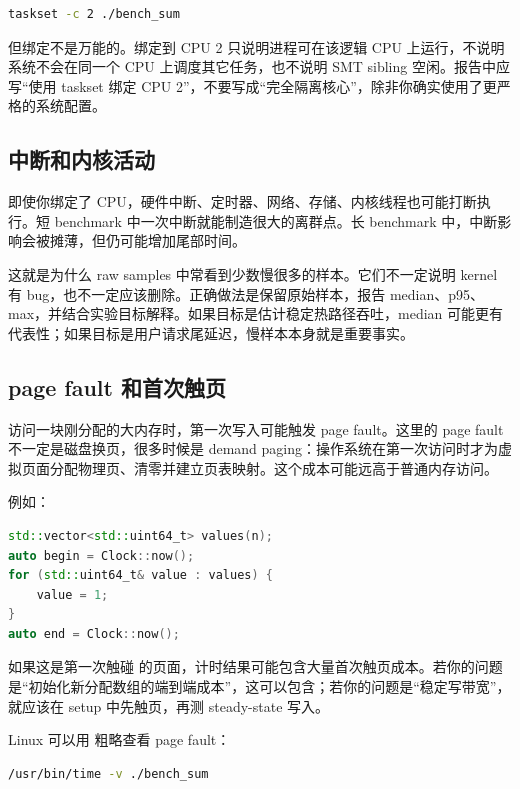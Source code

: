 \begin{lstlisting}[language=bash]
taskset -c 2 ./bench_sum
\end{lstlisting}

但绑定不是万能的。绑定到 CPU 2 只说明进程可在该逻辑 CPU 上运行，不说明系统不会在同一个 CPU 上调度其它任务，也不说明 SMT sibling 空闲。报告中应写“使用 taskset 绑定 CPU 2”，不要写成“完全隔离核心”，除非你确实使用了更严格的系统配置。

\subsection{中断和内核活动}

即使你绑定了 CPU，硬件中断、定时器、网络、存储、内核线程也可能打断执行。短 benchmark 中一次中断就能制造很大的离群点。长 benchmark 中，中断影响会被摊薄，但仍可能增加尾部时间。

这就是为什么 raw samples 中常看到少数慢很多的样本。它们不一定说明 kernel 有 bug，也不一定应该删除。正确做法是保留原始样本，报告 median、p95、max，并结合实验目标解释。如果目标是估计稳定热路径吞吐，median 可能更有代表性；如果目标是用户请求尾延迟，慢样本本身就是重要事实。

\subsection{page fault 和首次触页}

访问一块刚分配的大内存时，第一次写入可能触发 page fault。这里的 page fault 不一定是磁盘换页，很多时候是 demand paging：操作系统在第一次访问时才为虚拟页面分配物理页、清零并建立页表映射。这个成本可能远高于普通内存访问。

例如：

\begin{lstlisting}[language=C++]
std::vector<std::uint64_t> values(n);
auto begin = Clock::now();
for (std::uint64_t& value : values) {
    value = 1;
}
auto end = Clock::now();
\end{lstlisting}

如果这是第一次触碰  的页面，计时结果可能包含大量首次触页成本。若你的问题是“初始化新分配数组的端到端成本”，这可以包含；若你的问题是“稳定写带宽”，就应该在 setup 中先触页，再测 steady-state 写入。

Linux 可以用  粗略查看 page fault：

\begin{lstlisting}[language=bash]
/usr/bin/time -v ./bench_sum
\end{lstlisting}

